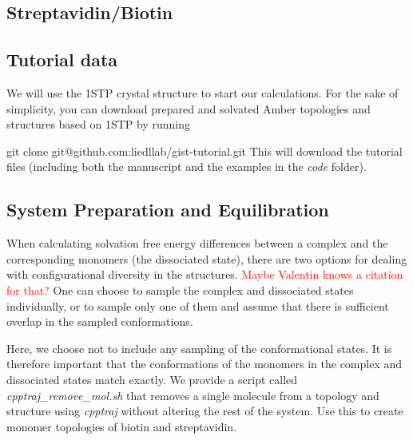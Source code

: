 \documentclass[9pt,tutorial]{livecoms}
\newcommand{\software}{\emph}
\newcommand{\todo}{\textcolor{red}}
\newenvironment{code}{\par \noindent \ttfamily}{}
\begin{document}
\subsection{Streptavidin/Biotin}
\subsection{Tutorial data}
We will use the 1STP crystal structure to start our calculations.
For the sake of simplicity, you can download prepared and solvated Amber topologies and structures based on 1STP by running
\begin{code}
git clone git@github.com:liedllab/gist-tutorial.git
\end{code}
This will download the tutorial files (including both the manuscript and the examples in the \software{code} folder).
\subsection{System Preparation and Equilibration}
When calculating solvation free energy differences between a complex and the corresponding monomers (the dissociated state), there are two options for dealing with configurational diversity in the structures.
\todo{Maybe Valentin knows a citation for that?}
One can choose to sample the complex and dissociated states individually, or to sample only one of them and assume that there is sufficient overlap in the sampled conformations.

Here, we choose not to include any sampling of the conformational states. It is therefore important that the conformations of the monomers in the complex and dissociated states match exactly. We provide a script called \software{cpptraj\_remove\_mol.sh} that removes a single molecule from a topology and structure using \software{cpptraj} without altering the rest of the system. Use this to create monomer topologies of biotin and streptavidin.
\end{document}
